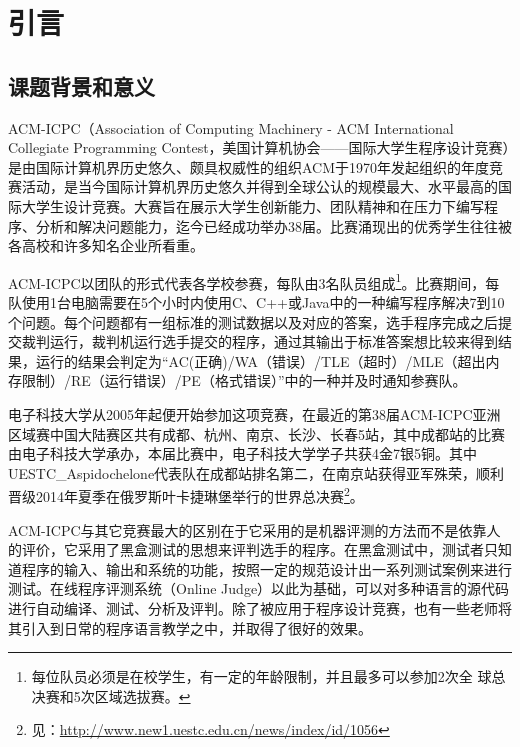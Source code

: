 
\chapter{引言}
\section{课题背景和意义}
ACM-ICPC（Association of Computing Machinery - ACM International Collegiate Programming Contest，美国计算机协会——国际大学生程序设计竞赛）是由国际计算机界历史悠久、颇具权威性的组织ACM于1970年发起组织的年度竞赛活动，是当今国际计算机界历史悠久并得到全球公认的规模最大、水平最高的国际大学生设计竞赛。大赛旨在展示大学生创新能力、团队精神和在压力下编写程序、分析和解决问题能力，迄今已经成功举办38届。比赛涌现出的优秀学生往往被各高校和许多知名企业所看重。

ACM-ICPC以团队的形式代表各学校参赛，每队由3名队员组成\footnote{每位队员必须是在校学生，有一定的年龄限制，并且最多可以参加2次全
球总决赛和5次区域选拔赛。}。比赛期间，每队使用1台电脑需要在5个小时内使用C、C++或Java中的一种编写程序解决7到10个问题。每个问题都有一组标准的测试数据以及对应的答案，选手程序完成之后提交裁判运行，裁判机运行选手提交的程序，通过其输出于标准答案想比较来得到结果，运行的结果会判定为``AC(正确)/WA（错误）/TLE（超时）/MLE（超出内存限制）/RE（运行错误）/PE（格式错误）''中的一种并及时通知参赛队。

电子科技大学从2005年起便开始参加这项竞赛，在最近的第38届ACM-ICPC亚洲区域赛中国大陆赛区共有成都、杭州、南京、长沙、长春5站，其中成都站的比赛由电子科技大学承办，本届比赛中，电子科技大学学子共获4金7银5铜。其中UESTC\_Aspidochelone代表队在成都站排名第二，在南京站获得亚军殊荣，顺利晋级2014年夏季在俄罗斯叶卡捷琳堡举行的世界总决赛\footnote{见：\url{http://www.new1.uestc.edu.cn/news/index/id/1056}}。

ACM-ICPC与其它竞赛最大的区别在于它采用的是机器评测的方法而不是依靠人的评价，它采用了黑盒测试\cite{beizer1995black}的思想来评判选手的程序。在黑盒测试中，测试者只知道程序的输入、输出和系统的功能，按照一定的规范设计出一系列测试案例来进行测试。在线程序评测系统（Online Judge）以此为基础，可以对多种语言的源代码进行自动编译、测试、分析及评判。除了被应用于程序设计竞赛，也有一些老师将其引入到日常的程序语言教学之中，并取得了很好的效果\cite{youfeng2009acm}\cite{guosongshan2007acm}。

